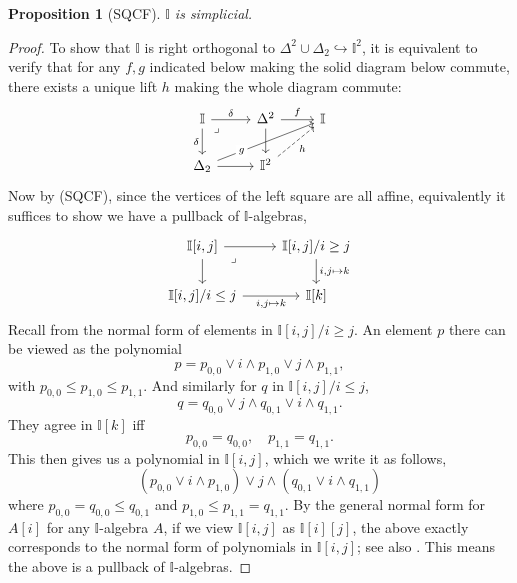 \documentclass[12pt]{amsart}
\newtheorem{proposition}[theorem]{Proposition}
\theoremstyle{definition}
\newcommand{\mbb}[1]{\mathbb{#1}}
\newcommand{\I}{\mbb I}
\newcommand{\hook}{\hookrightarrow}
\begin{document}
\begin{proposition}[SQCF]\label{specissimplicial}
  $\I$ is simplicial.
\end{proposition}
\begin{proof}
  To show that $\I$ is right orthogonal to $\Delta^2 \cup \Delta_2 \hook \I^2$, it is equivalent to verify that for any $f,g$ indicated below making the solid diagram below commute, there exists a unique lift $h$ making the whole diagram commute:
  \[\begin{tikzcd}
    \I \ar[r, "\delta"] \ar[d, "\delta"'] & \Delta^2 \ar[r, "f"] \ar[d] & \I \\
    \Delta_2 \ar[urr, "g"{description, near start}] \ar[r] & \I^2 \ar[ur, dashed, "h"']
    \arrow["\lrcorner"{anchor=center, pos=0.125}, draw=none, from=1-1, to=2-2]
  \end{tikzcd}\]
  Now by (SQCF), since the vertices of the left square are all affine, equivalently it suffices to show we have a pullback of $\I$-algebras,
  \[\begin{tikzcd}
    {\I[i,j]} \ar[r] \ar[d] & {\I[i,j]/i \ge j} \ar[d, "{i,j \mapsto k}"] \\
    {\I[i,j]/i \le j} \ar[r, "{i,j\mapsto k}"'] & {\I[k]}
    \arrow["\lrcorner"{anchor=center, pos=0.125}, draw=none, from=1-1, to=2-2]
  \end{tikzcd}\]
  Recall from  the normal form of elements in $\I[i,j]/i\ge j$. An element $p$ there can be viewed as the polynomial 
  \[ p = p_{0,0} \vee i \wedge p_{1,0} \vee j \wedge p_{1,1}, \]
  with $p_{0,0} \le p_{1,0} \le p_{1,1}$. And similarly for $q$ in $\I[i,j]/i \le j$, 
  \[ q = q_{0,0} \vee j \wedge q_{0,1} \vee i \wedge q_{1,1}. \]
  They agree in $\I[k]$ iff 
  \[ p_{0,0} = q_{0,0}, \quad p_{1,1} = q_{1,1}. \]
  This then gives us a polynomial in $\I[i,j]$, which we write it as follows,
  \[ (p_{0,0} \vee i \wedge p_{1,0}) \vee j \wedge (q_{0,1} \vee i \wedge q_{1,1}) \]
  where $p_{0,0} = q_{0,0} \le q_{0,1}$ and $p_{1,0} \le p_{1,1} = q_{1,1}$. 
  By the general normal form for $A[i]$ for any $\I$-algebra $A$, if we view $\I[i,j]$ as $\I[i][j]$, the above exactly corresponds to the normal form of polynomials in $\I[i,j]$; see also \citet[Thm. 10.21]{lausch2000algebra}. This means the above is a pullback of $\I$-algebras.
\end{proof}
\end{document}

